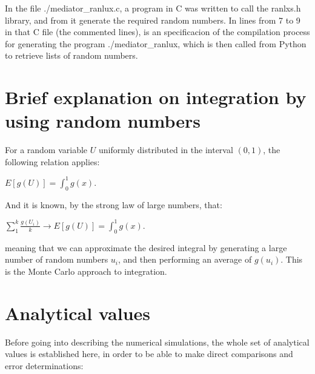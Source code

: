 \documentclass[paper=a4, fontsize=11pt]{scrartcl} %
\numberwithin{equation}{section} %
\numberwithin{figure}{section} %
\numberwithin{table}{section} %
\begin{document}
In the file ./mediator\_ranlux.c, a program in C was written to call the ranlxs.h library, and from it generate the required random numbers. In lines from 7 to 9 in that C file (the commented lines), is an specificacion of the compilation process for generating the program ./mediator\_ranlux, which is then called from Python to retrieve lists of random numbers.


\section{Brief explanation on integration by using random numbers}


For a random variable $U$ uniformly distributed in the interval $(0,1)$, the following relation applies:

\begin{center}
$E[g(U)] = \int_{0}^{1}g(x)$.
\end{center}

And it is known, by the strong law of large numbers, that:

\begin{center}
$\sum_{1}^{k}\frac{g(U_{i})}{k} \rightarrow E[g(U)] = \int_{0}^{1}g(x)$.
\end{center}

meaning that we can approximate the desired integral by generating a large number of random numbers $u_{i}$, and then performing an average of $g(u_{i})$. This is the Monte Carlo approach to integration.


\section{Analytical values}

Before going into describing the numerical simulations, the whole set of analytical values is established here, in order to be able to make direct comparisons and error determinations:
\end{document}
